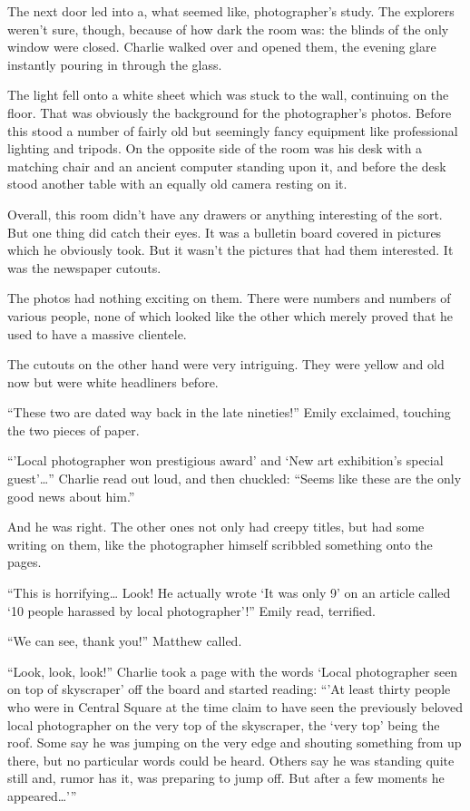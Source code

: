 The next door led into a, what seemed like, photographer's study. The explorers weren't sure, though, because of how dark the room was: the blinds of the only window were closed. Charlie walked over and opened them, the evening glare instantly pouring in through the glass.

The light fell onto a white sheet which was stuck to the wall, continuing on the floor. That was obviously the background for the photographer's photos. Before this stood a number of fairly old but seemingly fancy equipment like professional lighting and tripods. On the opposite side of the room was his desk with a matching chair and an ancient computer standing upon it, and before the desk stood another table with an equally old camera resting on it.

Overall, this room didn't have any drawers or anything interesting of the sort. But one thing did catch their eyes. It was a bulletin board covered in pictures which he obviously took. But it wasn't the pictures that had them interested. It was the newspaper cutouts.

The photos had nothing exciting on them. There were numbers and numbers of various people, none of which looked like the other which merely proved that he used to have a massive clientele.

The cutouts on the other hand were very intriguing. They were yellow and old now but were white headliners before.

“These two are dated way back in the late nineties!” Emily exclaimed, touching the two pieces of paper.

“'Local photographer won prestigious award' and ‘New art exhibition's special guest'…” Charlie read out loud, and then chuckled: “Seems like these are the only good news about him.”

And he was right. The other ones not only had creepy titles, but had some writing on them, like the photographer himself scribbled something onto the pages.

“This is horrifying… Look! He actually wrote ‘It was only 9' on an article called ‘10 people harassed by local photographer'!” Emily read, terrified.

“We can see, thank you!” Matthew called.

“Look, look, look!” Charlie took a page with the words ‘Local photographer seen on top of skyscraper' off the board and started reading: “'At least thirty people who were in Central Square at the time claim to have seen the previously beloved local photographer on the very top of the skyscraper, the ‘very top' being the roof. Some say he was jumping on the very edge and shouting something from up there, but no particular words could be heard. Others say he was standing quite still and, rumor has it, was preparing to jump off. But after a few moments he appeared…'”

